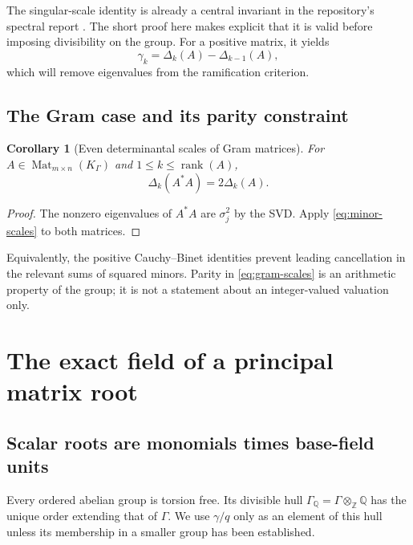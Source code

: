 \documentclass[11pt,letterpaper]{article}
\numberwithin{equation}{section}
\newtheorem{corollary}[theorem]{Corollary}
\theoremstyle{definition}
\theoremstyle{remark}
\newcommand{\Q}{\mathbb Q}
\newcommand{\Z}{\mathbb Z}
\newcommand{\Mat}{\operatorname{Mat}}
\newcommand{\rank}{\operatorname{rank}}
\newcommand{\KG}{K_{\Gamma}}
\begin{document}
The singular-scale identity is already a central invariant in the
repository's spectral report \cite{RepoSpectral}. The short proof here makes
explicit that it is valid before imposing divisibility on the group.
For a positive matrix, it yields
\begin{equation}\label{eq:recover-gamma}
 \gamma_k=\Delta_k(A)-\Delta_{k-1}(A),
\end{equation}
which will remove eigenvalues from the ramification criterion.

\subsection{The Gram case and its parity constraint}

\begin{corollary}[Even determinantal scales of Gram matrices]\label{cor:gram-scales}
For $A\in\Mat_{m\times n}(\KG)$ and $1\le k\le\rank(A)$,
\begin{equation}\label{eq:gram-scales}
 \Delta_k(A^*A)=2\Delta_k(A).
\end{equation}
\end{corollary}
\begin{proof}
The nonzero eigenvalues of $A^*A$ are $\sigma_j^2$ by the SVD. Apply
\cref{eq:minor-scales} to both matrices.
\end{proof}

Equivalently, the positive Cauchy--Binet identities prevent leading
cancellation in the relevant sums of squared minors. Parity in
\cref{eq:gram-scales} is an arithmetic property of the group; it is not a
statement about an integer-valued valuation only.

\section{The exact field of a principal matrix root}
\label{sec:roots}

\subsection{Scalar roots are monomials times base-field units}

Every ordered abelian group is torsion free. Its divisible hull
$\Gamma_{\Q}=\Gamma\otimes_\Z\Q$ has the unique order extending that of
$\Gamma$. We use $\gamma/q$ only as an element of this hull unless its
membership in a smaller group has been established.
\end{document}
